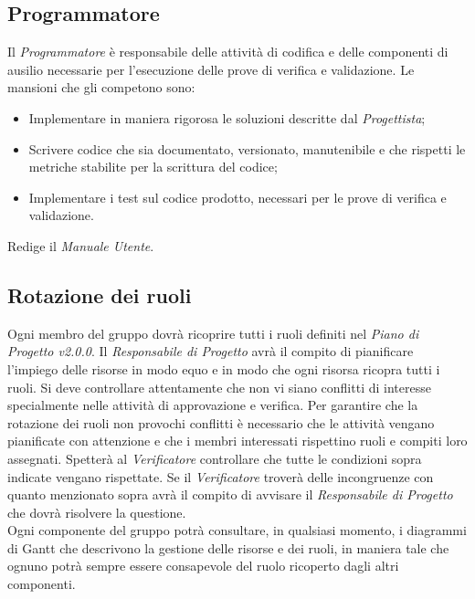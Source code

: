 \subsection{Programmatore}
Il \textit{Programmatore} è responsabile delle attività di codifica e delle componenti di ausilio necessarie per l'esecuzione delle prove di verifica e validazione. Le mansioni che gli competono sono:
\begin{itemize}
	\item Implementare in maniera rigorosa le soluzioni descritte dal \textit{Progettista};
	\item Scrivere codice che sia documentato, versionato, manutenibile e che rispetti le metriche stabilite per la scrittura del codice;
	\item Implementare i test sul codice prodotto, necessari per le prove di verifica e validazione.
\end{itemize}
Redige il \textit{Manuale Utente}.

\subsection{Rotazione dei ruoli}
Ogni membro del gruppo dovrà ricoprire tutti i ruoli definiti nel \textit{Piano di Progetto v2.0.0}. Il \textit{Responsabile di Progetto} avrà il compito di pianificare l'impiego delle risorse in modo equo e in modo che ogni risorsa ricopra tutti i ruoli. 
Si deve controllare attentamente che non vi siano conflitti di interesse specialmente nelle attività di approvazione e verifica. Per garantire che la rotazione dei ruoli non provochi conflitti è necessario che le attività vengano pianificate con attenzione e che i membri interessati rispettino ruoli e compiti loro assegnati. Spetterà al \textit{Verificatore} controllare che tutte le condizioni sopra indicate vengano rispettate. Se il \textit{Verificatore} troverà delle incongruenze con quanto menzionato sopra avrà il compito di avvisare il \textit{Responsabile di Progetto} che dovrà risolvere la questione.\\
Ogni componente del gruppo potrà consultare, in qualsiasi momento, i diagrammi di Gantt che descrivono la gestione delle risorse e dei ruoli, in maniera tale che ognuno potrà sempre essere consapevole del ruolo ricoperto dagli altri componenti.

